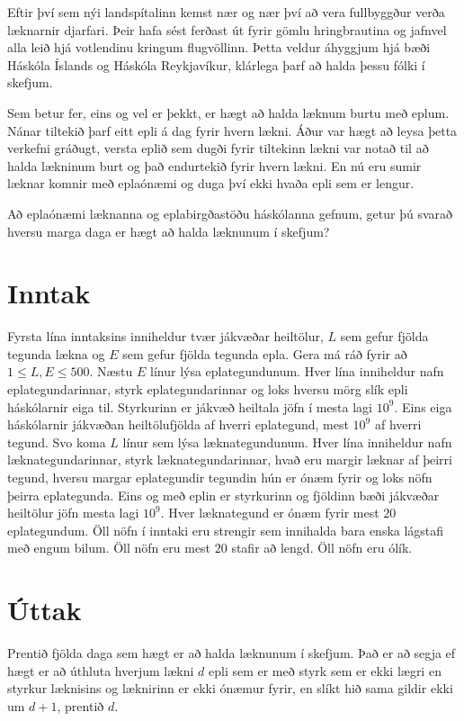 
Eftir því sem nýi landspítalinn kemst nær og nær því að vera
fullbyggður verða læknarnir djarfari. Þeir hafa sést ferðast
út fyrir gömlu hringbrautina og jafnvel alla leið hjá
votlendinu kringum flugvöllinn. Þetta veldur áhyggjum hjá
bæði Háskóla Íslands og Háskóla Reykjavíkur, klárlega
þarf að halda þessu fólki í skefjum. 

Sem betur fer, eins og vel er þekkt, er hægt að halda læknum
burtu með eplum. Nánar tiltekið þarf eitt epli á dag fyrir
hvern lækni. Áður var hægt að leysa þetta verkefni gráðugt,
versta eplið sem dugði fyrir tiltekinn lækni var notað til að
halda lækninum burt og það endurtekið fyrir hvern lækni.
En nú eru sumir læknar komnir með eplaónæmi og duga því ekki
hvaða epli sem er lengur.

Að eplaónæmi læknanna og eplabirgðastöðu háskólanna gefnum,
getur þú svarað hversu marga daga er hægt að halda læknunum
í skefjum?

\section*{Inntak}
Fyrsta lína inntaksins inniheldur tvær jákvæðar heiltölur,
$L$ sem gefur fjölda tegunda lækna og $E$ sem gefur fjölda
tegunda epla.
Gera má ráð fyrir að $1 \leq L, E \leq 500$.
Næstu $E$ línur lýsa eplategundunum. Hver lína inniheldur
nafn eplategundarinnar, styrk eplategundarinnar og loks
hversu mörg slík epli háskólarnir eiga til.
Styrkurinn er jákvæð heiltala jöfn í mesta lagi $10^9$.
Eins eiga háskólarnir jákvæðan heiltölufjölda af hverri
eplategund, mest $10^9$ af hverri tegund.
Svo koma $L$ línur sem lýsa læknategundunum.
Hver lína inniheldur nafn læknategundarinnar, styrk
læknategundarinnar, hvað eru margir læknar af þeirri
tegund, hversu margar eplategundir tegundin
hún er ónæm fyrir og loks nöfn þeirra eplategunda.
Eins og með eplin er styrkurinn og fjöldinn bæði
jákvæðar heiltölur jöfn mesta lagi $10^9$.
Hver læknategund er ónæm fyrir mest $20$ eplategundum.
Öll nöfn í inntaki eru strengir sem innihalda bara
enska lágstafi með engum bilum. Öll nöfn eru mest
$20$ stafir að lengd. Öll nöfn eru ólík.

\section*{Úttak}
Prentið fjölda daga sem hægt er að halda læknunum í skefjum.
Það er að segja ef hægt er að úthluta hverjum lækni $d$ epli
sem er með styrk sem er ekki lægri en styrkur læknisins og
læknirinn er ekki ónæmur fyrir, en slíkt hið sama gildir ekki
um $d + 1$, prentið $d$.
